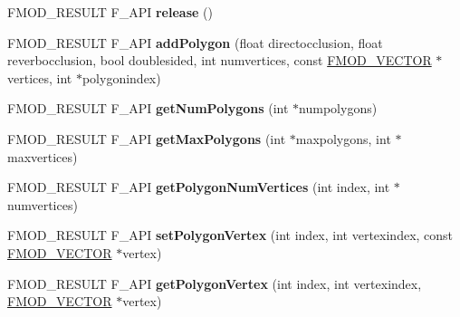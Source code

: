 \begin{DoxyCompactItemize}
\item 
\hypertarget{class_f_m_o_d_1_1_geometry_ad984475b495e44b9c0ed0b2b1377c65c}{F\+M\+O\+D\+\_\+\+R\+E\+S\+U\+L\+T F\+\_\+\+A\+P\+I {\bfseries release} ()}\label{class_f_m_o_d_1_1_geometry_ad984475b495e44b9c0ed0b2b1377c65c}

\item 
\hypertarget{class_f_m_o_d_1_1_geometry_ad136a5cbb2de501723a3cbdee0165998}{F\+M\+O\+D\+\_\+\+R\+E\+S\+U\+L\+T F\+\_\+\+A\+P\+I {\bfseries add\+Polygon} (float directocclusion, float reverbocclusion, bool doublesided, int numvertices, const \hyperlink{struct_f_m_o_d___v_e_c_t_o_r}{F\+M\+O\+D\+\_\+\+V\+E\+C\+T\+O\+R} $\ast$vertices, int $\ast$polygonindex)}\label{class_f_m_o_d_1_1_geometry_ad136a5cbb2de501723a3cbdee0165998}

\item 
\hypertarget{class_f_m_o_d_1_1_geometry_aa827d0503715f5bf09680660c4d3b841}{F\+M\+O\+D\+\_\+\+R\+E\+S\+U\+L\+T F\+\_\+\+A\+P\+I {\bfseries get\+Num\+Polygons} (int $\ast$numpolygons)}\label{class_f_m_o_d_1_1_geometry_aa827d0503715f5bf09680660c4d3b841}

\item 
\hypertarget{class_f_m_o_d_1_1_geometry_af735ddc6409a2f3df7309775921f1557}{F\+M\+O\+D\+\_\+\+R\+E\+S\+U\+L\+T F\+\_\+\+A\+P\+I {\bfseries get\+Max\+Polygons} (int $\ast$maxpolygons, int $\ast$maxvertices)}\label{class_f_m_o_d_1_1_geometry_af735ddc6409a2f3df7309775921f1557}

\item 
\hypertarget{class_f_m_o_d_1_1_geometry_a54c09b03e10d8d6a4d03a7d9a65e8731}{F\+M\+O\+D\+\_\+\+R\+E\+S\+U\+L\+T F\+\_\+\+A\+P\+I {\bfseries get\+Polygon\+Num\+Vertices} (int index, int $\ast$numvertices)}\label{class_f_m_o_d_1_1_geometry_a54c09b03e10d8d6a4d03a7d9a65e8731}

\item 
\hypertarget{class_f_m_o_d_1_1_geometry_af8d0ccb341379a2e3a47942a330e0485}{F\+M\+O\+D\+\_\+\+R\+E\+S\+U\+L\+T F\+\_\+\+A\+P\+I {\bfseries set\+Polygon\+Vertex} (int index, int vertexindex, const \hyperlink{struct_f_m_o_d___v_e_c_t_o_r}{F\+M\+O\+D\+\_\+\+V\+E\+C\+T\+O\+R} $\ast$vertex)}\label{class_f_m_o_d_1_1_geometry_af8d0ccb341379a2e3a47942a330e0485}

\item 
\hypertarget{class_f_m_o_d_1_1_geometry_ac318ff7a7b5d48aa1d4c6e432e46ecd3}{F\+M\+O\+D\+\_\+\+R\+E\+S\+U\+L\+T F\+\_\+\+A\+P\+I {\bfseries get\+Polygon\+Vertex} (int index, int vertexindex, \hyperlink{struct_f_m_o_d___v_e_c_t_o_r}{F\+M\+O\+D\+\_\+\+V\+E\+C\+T\+O\+R} $\ast$vertex)}\label{class_f_m_o_d_1_1_geometry_ac318ff7a7b5d48aa1d4c6e432e46ecd3}


\end{DoxyCompactItemize}
